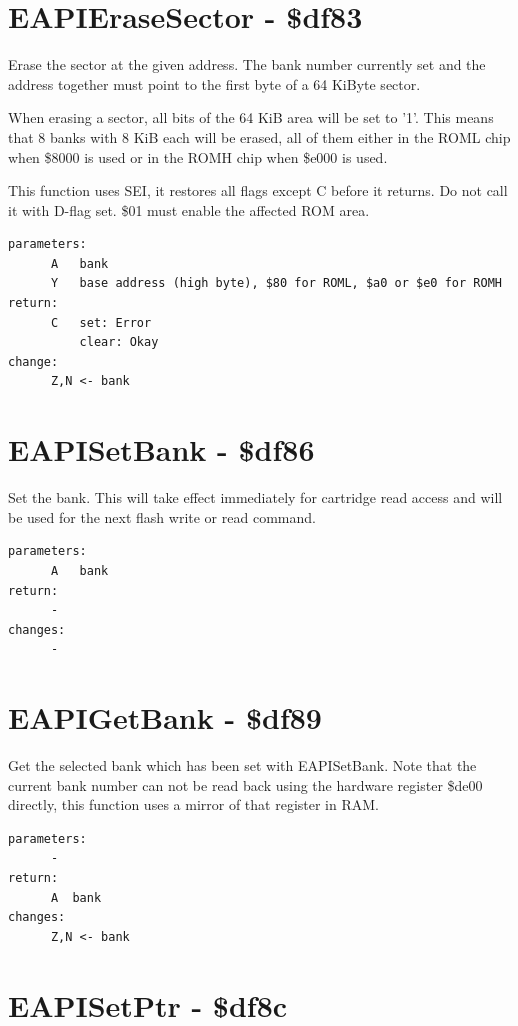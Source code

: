 \documentclass[a4paper,oneside]{memoir}
\begin{document}
\section{EAPIEraseSector - \$df83}

Erase the sector at the given address. The bank number currently set and the
address together must point to the first byte of a 64 KiByte sector.

When erasing a sector, all bits of the 64 KiB area will be set to '1'.
This means that 8 banks with 8 KiB each will be erased, all of them either
in the ROML chip when \$8000 is used or in the ROMH chip when \$e000 is
used.

This function uses SEI, it restores all flags except C before it returns.
Do not call it with D-flag set. \$01 must enable the affected ROM area.

\begin{verbatim}
parameters:
      A   bank
      Y   base address (high byte), $80 for ROML, $a0 or $e0 for ROMH
return:
      C   set: Error
          clear: Okay
change:
      Z,N <- bank
\end{verbatim}


\section{EAPISetBank - \$df86}

Set the bank. This will take effect immediately for cartridge read access
and will be used for the next flash write or read command.

\begin{verbatim}
parameters:
      A   bank
return:
      -
changes:
      -
\end{verbatim}


\section{EAPIGetBank - \$df89}

Get the selected bank which has been set with EAPISetBank.
Note that the current bank number can not be read back using the hardware
register \$de00 directly, this function uses a mirror of that register in RAM.

\begin{verbatim}
parameters:
      -
return:
      A  bank
changes:
      Z,N <- bank
\end{verbatim}


\section{EAPISetPtr - \$df8c}
\end{document}
